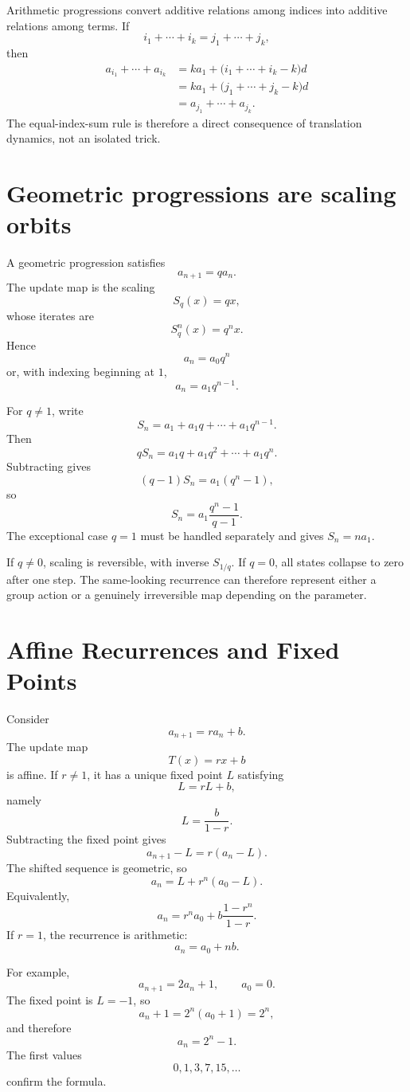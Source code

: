 Arithmetic progressions convert additive relations among indices into additive relations among terms.  If
\[
  i_1+\cdots+i_k=j_1+\cdots+j_k,
\]
then
\[
\begin{aligned}
a_{i_1}+\cdots+a_{i_k}
&=ka_1+\bigl(i_1+\cdots+i_k-k\bigr)d\\
&=ka_1+\bigl(j_1+\cdots+j_k-k\bigr)d\\
&=a_{j_1}+\cdots+a_{j_k}.
\end{aligned}
\]
The equal-index-sum rule is therefore a direct consequence of translation dynamics, not an isolated trick.

\section{Geometric progressions are scaling orbits}

A geometric progression satisfies
\[
  a_{n+1}=qa_n.
\]
The update map is the scaling
\[
  S_q(x)=qx,
\]
whose iterates are
\[
  S_q^n(x)=q^n x.
\]
Hence
\[
  \boxed{a_n=a_0q^n}
\]
or, with indexing beginning at \(1\),
\[
  a_n=a_1q^{n-1}.
\]

For \(q\neq1\), write
\[
  S_n=a_1+a_1q+\cdots+a_1q^{n-1}.
\]
Then
\[
  qS_n=a_1q+a_1q^2+\cdots+a_1q^n.
\]
Subtracting gives
\[
  (q-1)S_n=a_1(q^n-1),
\]
so
\[
  \boxed{S_n=a_1\frac{q^n-1}{q-1}.}
\]
The exceptional case \(q=1\) must be handled separately and gives \(S_n=na_1\).

If \(q\neq0\), scaling is reversible, with inverse \(S_{1/q}\).  If \(q=0\), all states collapse to zero after one step.  The same-looking recurrence can therefore represent either a group action or a genuinely irreversible map depending on the parameter.

\section{Affine Recurrences and Fixed Points}

Consider
\[
  a_{n+1}=ra_n+b.
\]
The update map
\[
  T(x)=rx+b
\]
is affine.  If \(r\neq1\), it has a unique fixed point \(L\) satisfying
\[
  L=rL+b,
\]
namely
\[
  L=\frac{b}{1-r}.
\]
Subtracting the fixed point gives
\[
  a_{n+1}-L=r(a_n-L).
\]
The shifted sequence is geometric, so
\[
  \boxed{a_n=L+r^n(a_0-L).}
\]
Equivalently,
\[
  a_n=r^n a_0+b\frac{1-r^n}{1-r}.
\]
If \(r=1\), the recurrence is arithmetic:
\[
  a_n=a_0+nb.
\]

For example,
\[
  a_{n+1}=2a_n+1,
  \qquad
  a_0=0.
\]
The fixed point is \(L=-1\), so
\[
  a_n+1=2^n(a_0+1)=2^n,
\]
and therefore
\[
  \boxed{a_n=2^n-1.}
\]
The first values
\[
  0,1,3,7,15,\ldots
\]
confirm the formula.

